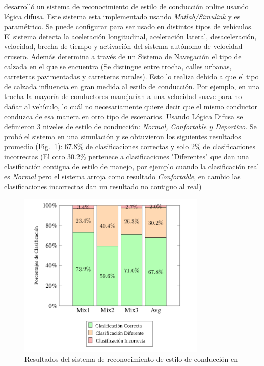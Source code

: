 \citeauthor{6957822} \cite{6957822} desarrolló un sistema de reconocimiento de estilo de conducción online usando lógica difusa. Este sistema esta implementado usando {\it Matlab/Simulink}  y es paramétrico. Se puede configurar para ser usado en distintos tipos de vehículos.
El sistema detecta la aceleración longitudinal, aceleración lateral, desaceleración, velocidad, brecha de tiempo y activación del sistema autónomo de velocidad crusero. Además determina a través de un Sistema de Navegación el tipo de calzada en el que se encuentra (Se distingue entre trocha, calles urbanas, carreteras pavimentadas y carreteras rurales). Esto lo realiza debido a que el tipo de calzada influencia en gran medida al estilo de conducción. Por ejemplo, en una trocha la mayoría de conductores manejarían a una velocidad suave para no dañar al vehículo, lo cuál no necesariamente quiere decir que el mismo conductor conduzca de esa manera en otro tipo de escenarios.
Usando Lógica Difusa se definieron 3 niveles de estilo de conducción: {\it Normal, Confortable y Deportivo}. Se probó el sistema en una simulación y se obtuvieron los siguientes resultados promedio (Fig.~\ref{fig:2.2}): 67.8\% de clasificaciones correctas y solo 2\% de clasificaciones incorrectas (El otro 30.2\% pertenece a clasificaciones "Diferentes" que dan una clasificación contigua de estilo de manejo, por ejemplo cuando la clasificación real es {\it Normal} pero el sistema arroja como resultado {\it Confortable}, en cambio las clasificaciones incorrectas dan un resultado no contiguo al real)

\begin{figure}[htbp!]
\centering
\includegraphics[width=0.8\textwidth]{Fig2}
\caption[Resultados del sistema de reconocimiento de estilo de conducción]{Resultados del sistema de reconocimiento de estilo de conducción en \cite{6957822}}
\label{fig:2.2}
\end{figure}

